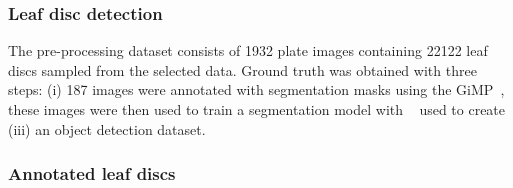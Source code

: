 \documentclass[english]{article}
\begin{document}
\subsubsection{Leaf disc detection}
The pre-processing dataset consists of 1932 plate images containing 22122 leaf discs sampled from the selected data. Ground truth was obtained with three steps: (i) 187 images were annotated with segmentation masks using the GiMP~\parencite{gimp}, these images were then used to train a segmentation model with ~\parencite{bergIlastikInteractiveMachine2019} used to create (iii) an object detection dataset.

\subsubsection{Annotated leaf discs}
\paragraph{}
\end{document}
